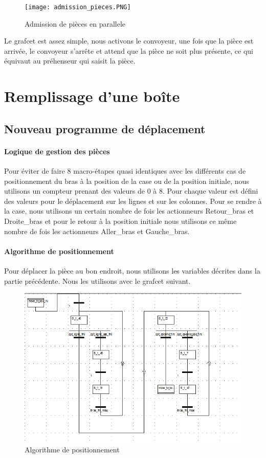 \documentclass[oneside,a4paper,12pt]{article}
\begin{document}
		\begin{figure}[h]
			\centering
			\texttt{[image: admission\_pieces.PNG]}
			\caption{Admission de pièces en parallele}
		\end{figure}
		
		Le grafcet est assez simple, nous activons le convoyeur, une fois que la pièce est arrivée, le convoyeur s’arrête et attend que la pièce ne soit plus présente, ce qui équivaut au préhenseur qui saisit la pièce. 
	
	\section{Remplissage d'une boîte}
				
		\subsection{Nouveau programme de déplacement}
			\paragraph{Logique de gestion des pièces}
			
			Pour éviter de faire 8 macro-étapes quasi identiques avec les différents cas de positionnement du bras à la position de la case ou de la position initiale, nous utilisons un compteur prenant des valeurs de 0 à 8. Pour chaque valeur est défini des valeurs pour le déplacement sur les lignes et sur les colonnes. Pour se rendre à la case, nous utilisons un certain nombre de fois les actionneurs Retour\_bras et Droite\_bras et pour le retour à la position initiale nous utilisons ce même nombre de fois les actionneurs Aller\_bras et Gauche\_bras.
			
			\paragraph{Algorithme de positionnement}

			Pour déplacer la pièce au bon endroit, nous utilisons les variables décrites dans la partie précédente. Nous les utilisons avec le grafcet suivant.
			
			\begin{figure}[h]
				\centering
				\includegraphics[width=12cm]{move_to_box.PNG}
				\caption{Algorithme de positionnement}
			\end{figure}
		
\end{document}
